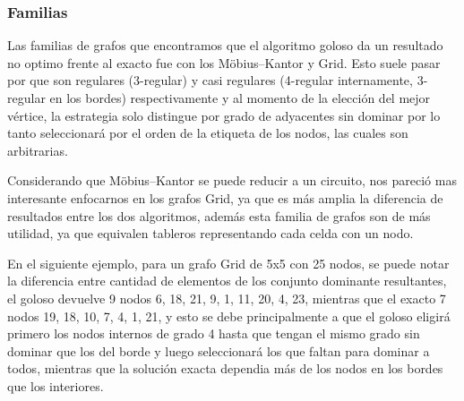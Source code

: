 \subsubsection {Familias}
Las familias de grafos que encontramos que el algoritmo goloso da un resultado no optimo frente al exacto fue con los Möbius–Kantor y Grid. Esto suele pasar por que son regulares (3-regular) y casi regulares (4-regular internamente, 3-regular en los bordes) respectivamente y al momento de la elección del mejor vértice, la estrategia solo distingue por grado de adyacentes sin dominar por lo tanto seleccionará por el orden de la etiqueta de los nodos, las cuales son arbitrarias. 

Considerando que Möbius–Kantor se puede reducir a un circuito, nos pareció mas interesante enfocarnos en los grafos Grid, ya que es más amplia la diferencia de resultados entre los dos algoritmos, además esta familia de grafos son de más utilidad, ya que equivalen tableros representando cada celda con un nodo.

En el siguiente ejemplo, para un grafo Grid de 5x5 con 25 nodos, se puede notar la diferencia entre cantidad de elementos de los conjunto dominante resultantes, el goloso devuelve 9 nodos {6, 18, 21, 9, 1, 11, 20, 4, 23}, mientras que el exacto 7 nodos {19, 18, 10, 7, 4, 1, 21}, y esto se debe principalmente a que el goloso eligirá primero los nodos internos de grado 4 hasta que tengan el mismo grado sin dominar que los del borde y luego seleccionará los que faltan para dominar a todos, mientras que la solución exacta dependia más de los nodos en los bordes que los interiores.
 
